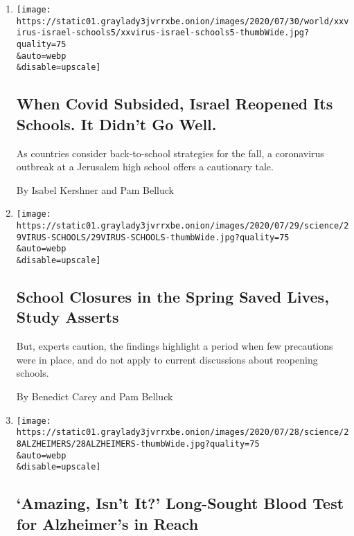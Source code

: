 \begin{enumerate}
\def\labelenumi{\arabic{enumi}.}
\item
  \href{/2020/08/04/world/middleeast/coronavirus-israel-schools-reopen.html}{}

  \texttt{[image: https://static01.graylady3jvrrxbe.onion/images/2020/07/30/world/xxvirus-israel-schools5/xxvirus-israel-schools5-thumbWide.jpg?quality=75\\\&auto=webp\\\&disable=upscale]}

  \hypertarget{when-covid-subsided-israel-reopened-its-schools-it-didnt-go-well}{%
  \subsection{When Covid Subsided, Israel Reopened Its Schools. It
  Didn't Go
  Well.}\label{when-covid-subsided-israel-reopened-its-schools-it-didnt-go-well}}

  As countries consider back-to-school strategies for the fall, a
  coronavirus outbreak at a Jerusalem high school offers a cautionary
  tale.

  By Isabel Kershner and Pam Belluck
\item
  \href{/2020/07/29/health/covid-school-reopening.html}{}

  \texttt{[image: https://static01.graylady3jvrrxbe.onion/images/2020/07/29/science/29VIRUS-SCHOOLS/29VIRUS-SCHOOLS-thumbWide.jpg?quality=75\\\&auto=webp\\\&disable=upscale]}

  \hypertarget{school-closures-in-the-spring-saved-lives-study-asserts}{%
  \subsection{School Closures in the Spring Saved Lives, Study
  Asserts}\label{school-closures-in-the-spring-saved-lives-study-asserts}}

  But, experts caution, the findings highlight a period when few
  precautions were in place, and do not apply to current discussions
  about reopening schools.

  By Benedict Carey and Pam Belluck
\item
  \href{/2020/07/28/health/alzheimers-blood-test.html}{}

  \texttt{[image: https://static01.graylady3jvrrxbe.onion/images/2020/07/28/science/28ALZHEIMERS/28ALZHEIMERS-thumbWide.jpg?quality=75\\\&auto=webp\\\&disable=upscale]}

  \hypertarget{amazing-isnt-it-long-sought-blood-test-for-alzheimers-in-reach}{%
  \subsection{`Amazing, Isn't It?' Long-Sought Blood Test for
  Alzheimer's in
  Reach}\label{amazing-isnt-it-long-sought-blood-test-for-alzheimers-in-reach}}


\end{enumerate}
